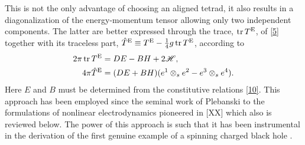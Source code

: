 This is not the only advantage of choosing an aligned tetrad, it also results in a diagonalization of the energy-momentum tensor allowing only two independent components. The latter are better expressed through the trace, $\tr T^{\rm E}$, of \eqref{5} together with its traceless part, $\hat{T}^{\rm E}\equiv T^{\rm E}-\frac{1}{4} g\tr T^{\rm E}$, according to
\begin{subequations}
	\begin{align}\label{11}
  2\pi \tr T^{\rm E}&=DE-BH+2\mathscr{H},\\
  4\pi \hat{T}^{\rm E}&=(DE+BH)(e^1\otimes_s e^2-e^3\otimes_s e^4).\label{11b}
\end{align}
\end{subequations}
Here $E$ and $B$ must be determined from the constitutive relations \eqref{10}. This approach has been employed since the seminal work of Plebanski \cite{Plebanski:1970zz} to the formulations of nonlinear electrodynamics pioneered in [XX] which also is reviewed below. The power of this approach is such that it has been instrumental in the derivation of the first genuine example of a spinning charged black hole \cite{Garcia-Diaz:2021bao, DiazGarcia:2022jpc, Ayon-Beato:2022dwg}.

